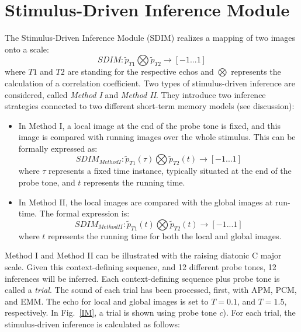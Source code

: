 \newpage
\section{Stimulus-Driven Inference Module}

The Stimulus-Driven Inference Module (SDIM) realizes a mapping of two images onto a
scale:
\begin{equation}
SDIM: \tilde{p}_{T1} \bigotimes \tilde{p}_{T2} \rightarrow [-1 ... 1]
\end{equation}
 where $T1$ and $T2$ are standing for the respective echos and $\bigotimes$
 represents the
calculation of a correlation coefficient. Two types of stimulus-driven inference are
considered, called {\sl Method I} and {\sl Method II}. They introduce two inference
strategies connected to two different short-term memory models (see discussion):
\begin{itemize}
\item
    In Method I, a local image at the end of the probe tone is fixed, and this image is
    compared with running images over the whole stimulus. This can be formally expressed
    as:
    \begin{displaymath}
    SDIM_{Method I}: \tilde{p}_{T1}(\tau) \bigotimes \tilde{p}_{T2}(t) \rightarrow [-1 ...
    1]
    \end{displaymath}
    where $\tau$ represents a fixed time instance, typically situated at the end of the
    probe tone, and $t$ represents the running time.
\item
    In Method II, the local images are compared with the global images at run-time. The
    formal expression is:
    \begin{displaymath}
    SDIM_{Method II}: \tilde{p}_{T1}(t) \bigotimes \tilde{p}_{T2}(t) \rightarrow [-1 ...
    1]
    \end{displaymath}
    where $t$ represents the running time for both the local and global images.
\end{itemize}

Method I and Method II can be illustrated with the raising
diatonic C major scale. Given this context-defining sequence, and
12 different probe tones, 12 inferences will be inferred. Each
context-defining sequence plus probe tone is called a {\sl trial}.
The sound of each trial has been processed, first, with APM, PCM,
and EMM. The echo for local and global images is set to $T=0.1$,
and $T=1.5$, respectively. In Fig.~\ref{IM}, a trial is shown
using probe tone $c$). For each trial, the stimulus-driven
inference is calculated as follows:

